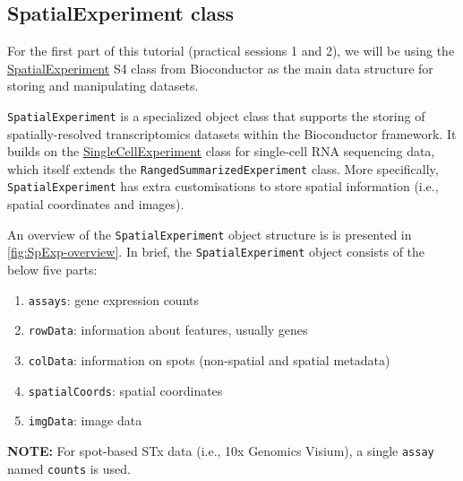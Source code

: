 \documentclass[
]{book}
\providecommand{\tightlist}{%
  \setlength{\itemsep}{0pt}\setlength{\parskip}{0pt}}
\begin{document}
\hypertarget{spatialexperiment-class}{%
\subsection{SpatialExperiment class}\label{spatialexperiment-class}}

For the first part of this tutorial (practical sessions 1 and 2), we will be using the \href{https://bioconductor.org/packages/SpatialExperiment}{SpatialExperiment} S4 class from Bioconductor as the main data structure for storing and manipulating datasets.

\texttt{SpatialExperiment} is a specialized object class that supports the storing of spatially-resolved transcriptomics datasets within the Bioconductor framework. It builds on the \href{https://bioconductor.org/packages/SingleCellExperiment}{SingleCellExperiment} class \citep{Amezquita2020Feb} for single-cell RNA sequencing data, which itself extends the \texttt{RangedSummarizedExperiment} class. More specifically, \texttt{SpatialExperiment} has extra customisations to store spatial information (i.e., spatial coordinates and images).

An overview of the \texttt{SpatialExperiment} object structure is is presented in \ref{fig:SpExp-overview}. In brief, the \texttt{SpatialExperiment} object consists of the below five parts:

\begin{enumerate}
\def\labelenumi{\arabic{enumi}.}
\tightlist
\item
  \texttt{assays}: gene expression counts\\
\item
  \texttt{rowData}: information about features, usually genes\\
\item
  \texttt{colData}: information on spots (non-spatial and spatial metadata)\\
\item
  \texttt{spatialCoords}: spatial coordinates\\
\item
  \texttt{imgData}: image data
\end{enumerate}

\textbf{NOTE:} For spot-based STx data (i.e., 10x Genomics Visium), a single \texttt{assay} named \texttt{counts} is used.
\end{document}
